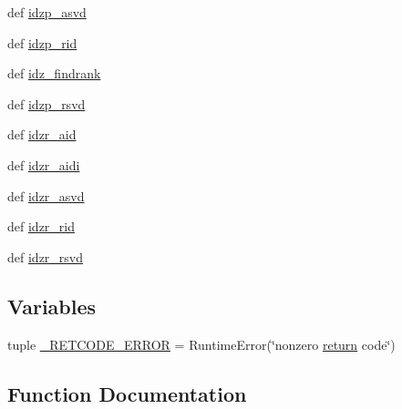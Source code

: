 \begin{DoxyCompactItemize}
\item 
def \hyperlink{namespacescipy_1_1linalg_1_1__interpolative__backend_a7d26bb7f6e677ccae6e2dc4fc7669ce9}{idzp\+\_\+asvd}
\item 
def \hyperlink{namespacescipy_1_1linalg_1_1__interpolative__backend_a385fe6daf2aa6476835d3f5c5cc5242a}{idzp\+\_\+rid}
\item 
def \hyperlink{namespacescipy_1_1linalg_1_1__interpolative__backend_a15d42c836f4469489c49354b81f3caf8}{idz\+\_\+findrank}
\item 
def \hyperlink{namespacescipy_1_1linalg_1_1__interpolative__backend_a064d49757c29991183b84f9cfab9482b}{idzp\+\_\+rsvd}
\item 
def \hyperlink{namespacescipy_1_1linalg_1_1__interpolative__backend_ab1edc81e778e224983a017a8df5c0847}{idzr\+\_\+aid}
\item 
def \hyperlink{namespacescipy_1_1linalg_1_1__interpolative__backend_ae13d358a6118326d06b4007d1ace71eb}{idzr\+\_\+aidi}
\item 
def \hyperlink{namespacescipy_1_1linalg_1_1__interpolative__backend_a74c3f66c2f52e00d9fdf07f62c77f994}{idzr\+\_\+asvd}
\item 
def \hyperlink{namespacescipy_1_1linalg_1_1__interpolative__backend_a389c640a37e9ea4fc8588bcf2b040acb}{idzr\+\_\+rid}
\item 
def \hyperlink{namespacescipy_1_1linalg_1_1__interpolative__backend_a84dffe1a101e7683cc0f7f341b72d00c}{idzr\+\_\+rsvd}
\end{DoxyCompactItemize}
\subsection*{Variables}
\begin{DoxyCompactItemize}
\item 
tuple \hyperlink{namespacescipy_1_1linalg_1_1__interpolative__backend_a6cc03696964433e44dc6bc073d197cff}{\+\_\+\+R\+E\+T\+C\+O\+D\+E\+\_\+\+E\+R\+R\+O\+R} = Runtime\+Error(\char`\"{}nonzero \hyperlink{stencilops_8h_afee67e5c8680c1bb9a8cb7bef7bfcc55}{return} code\char`\"{})
\end{DoxyCompactItemize}


\subsection{Function Documentation}
\hypertarget{namespacescipy_1_1linalg_1_1__interpolative__backend_abdf4970dd776dde170dd23634a8a3bc1}{}
